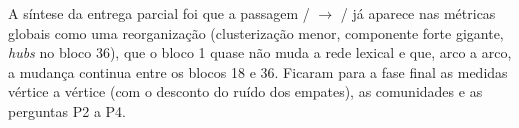 A síntese da entrega parcial foi que a passagem / $\to$
/ já aparece nas métricas globais como uma reorganização (clusterização
menor, componente forte gigante, \emph{hubs} no bloco 36), que o bloco 1 quase não muda a rede
lexical e que, arco a arco, a mudança continua entre os blocos 18 e 36. Ficaram para a fase
final as medidas vértice a vértice (com o desconto do ruído dos empates), as comunidades e as
perguntas P2 a P4.
